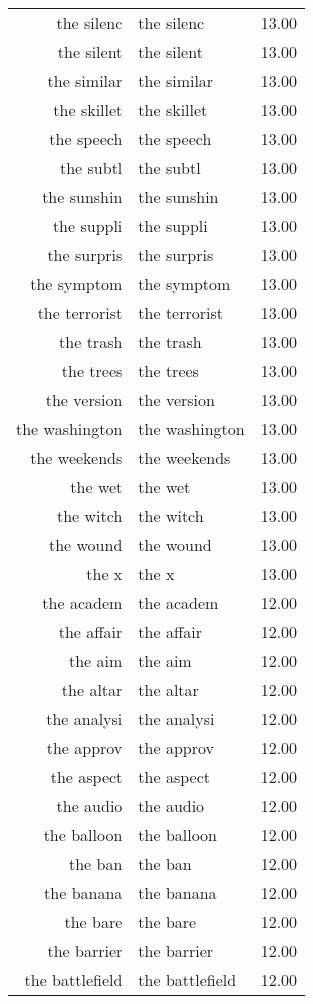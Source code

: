 \begin{table}[ht]
\begin{tabular}{rlr}
  the silenc & the silenc & 13.00 \\ 
  the silent & the silent & 13.00 \\ 
  the similar & the similar & 13.00 \\ 
  the skillet & the skillet & 13.00 \\ 
  the speech & the speech & 13.00 \\ 
  the subtl & the subtl & 13.00 \\ 
  the sunshin & the sunshin & 13.00 \\ 
  the suppli & the suppli & 13.00 \\ 
  the surpris & the surpris & 13.00 \\ 
  the symptom & the symptom & 13.00 \\ 
  the terrorist & the terrorist & 13.00 \\ 
  the trash & the trash & 13.00 \\ 
  the trees & the trees & 13.00 \\ 
  the version & the version & 13.00 \\ 
  the washington & the washington & 13.00 \\ 
  the weekends & the weekends & 13.00 \\ 
  the wet & the wet & 13.00 \\ 
  the witch & the witch & 13.00 \\ 
  the wound & the wound & 13.00 \\ 
  the x & the x & 13.00 \\ 
  the academ & the academ & 12.00 \\ 
  the affair & the affair & 12.00 \\ 
  the aim & the aim & 12.00 \\ 
  the altar & the altar & 12.00 \\ 
  the analysi & the analysi & 12.00 \\ 
  the approv & the approv & 12.00 \\ 
  the aspect & the aspect & 12.00 \\ 
  the audio & the audio & 12.00 \\ 
  the balloon & the balloon & 12.00 \\ 
  the ban & the ban & 12.00 \\ 
  the banana & the banana & 12.00 \\ 
  the bare & the bare & 12.00 \\ 
  the barrier & the barrier & 12.00 \\ 
  the battlefield & the battlefield & 12.00 \\ 

\end{tabular}
\end{table}

